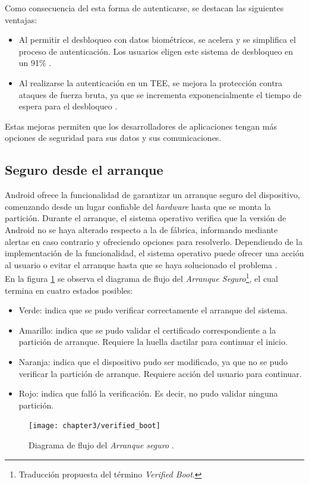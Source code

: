 Como consecuencia del esta forma de autenticarse, se destacan las siguientes ventajas:
\begin{itemize}
    \item Al permitir el desbloqueo con datos biométricos, se acelera y se simplifica el proceso de autenticación. Los usuarios eligen este sistema de desbloqueo en un 91\% \cite{asreview2015}.
    \item Al realizarse la autenticación en un TEE, se mejora la protección contra ataques de fuerza bruta, ya que se incrementa exponencialmente el tiempo de espera para el desbloqueo \cite{asreview2015}.
\end{itemize}
Estas mejoras permiten que los desarrolladores de aplicaciones tengan más opciones de seguridad para sus datos y sus comunicaciones.
\subsection{Seguro desde el arranque}\label{fig:ch03:verify-boot}
Android ofrece la funcionalidad de garantizar un arranque seguro del dispositivo, comenzando desde un lugar confiable del \textit{hardware} hasta que se monta la partición. Durante el arranque, el sistema operativo verifica que la versión de Android no se haya alterado respecto a la de fábrica, informando mediante alertas en caso contrario y ofreciendo opciones para resolverlo. Dependiendo de la implementación de la funcionalidad, el sistema operativo puede ofrecer una acción al usuario o evitar el arranque hasta que se haya solucionado el problema \cite{aossec}.\\
En la figura \ref{fig:ch03:verifyBoot} se observa el diagrama de flujo del \textit{Arranque Seguro}\footnote{Traducción propuesta del término \textit{Verified Boot}.}, el cual termina en cuatro estados posibles:
\begin{itemize}
	\item Verde: indica que se pudo verificar correctamente el arranque del sistema.
	\item Amarillo: indica que se pudo validar el certificado correspondiente a la partición de arranque. Requiere la huella dactilar para continuar el inicio.
	\item Naranja: indica que el dispositivo pudo ser modificado, ya que no se pudo verificar la partición de arranque. Requiere acción del usuario para continuar.
	\item Rojo: indica que falló la verificación. Es decir, no pudo validar ninguna partición.
\end{itemize}
\begin{figure}[htbp]
	\begin{center}
		\texttt{[image: chapter3/verified\_boot]}
		\caption{Diagrama de flujo del \textit{Arranque seguro} \cite{asreview2015}.}
		\label{fig:ch03:verifyBoot}
	\end{center}
\end{figure}

